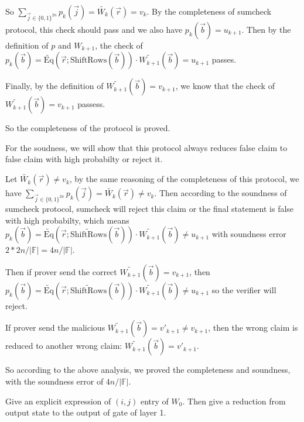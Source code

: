\documentclass[12pt]{article}
\newenvironment{ex}[2][Exercise]{\begin{trivlist}
\item[\hskip \labelsep {\bfseries #1}\hskip \labelsep {\bfseries #2.}]\begin{spacing}{1.0}}{\end{spacing}\end{trivlist}}
\newenvironment{sol}[1][Solution]{\begin{trivlist}
\item[\hskip \labelsep {\bfseries #1:}]}{\end{trivlist}}
\begin{document}
\begin{sol}
    So $\sum_{\vec{j}\in \{0,1\}^{2n}} p_k(\vec{j}) = \tilde{W_k}(\vec{r}) = v_k$. By the completeness of sumcheck protocol, this check should pass and we also have $p_k(\vec{b}) = u_{k+1}$. Then by the definition of $p$ and $W_{k+1}$, the check of $p_k(\vec{b}) = \tilde{\text{Eq}}(\vec{r};\text{ShiftRows}(\vec{b})) \cdot \tilde{W_{k+1}}(\vec{b}) = u_{k+1}$ passes.

    Finally, by the definition of $\tilde{W_{k+1}}(\vec{b}) = v_{k+1}$, we know that the check of $\tilde{W_{k+1}}(\vec{b}) = v_{k+1}$ passess.

    So the completeness of the protocol is proved.

    For the soudness, we will show that this protocol always reduces false claim to false claim with high probabilty or reject it.

    Let $\tilde{W_k}(\vec{r}) \ne v_k$, by the same reasoning of the completeness of this protocol, we have $\sum_{\vec{j}\in \{0,1\}^{2n}} p_k(\vec{j}) = \tilde{W_k}(\vec{r}) \ne v_k$. Then according to the soundness of sumcheck protocol, sumcheck will reject this claim or the final statement is false with high probabilty, which means $p_k(\vec{b}) = \tilde{\text{Eq}}(\vec{r};\tilde{\text{ShiftRows}}(\vec{b})) \cdot \tilde{W_{k+1}}(\vec{b}) \ne u_{k+1}$ with soundness error $2 * 2n / |\mathbb{F}| = 4n / |\mathbb{F}|$.

    Then if prover send the correct $\tilde{W_{k+1}}(\vec{b}) = v_{k+1}$, then $p_k(\vec{b}) = \tilde{\text{Eq}}(\vec{r};\tilde{\text{ShiftRows}}(\vec{b})) \cdot \tilde{W_{k+1}}(\vec{b}) \ne u_{k+1}$ so the verifier will reject.

    If prover send the malicious $\tilde{W_{k+1}}(\vec{b}) = v'_{k+1} \ne v_{k+1}$, then the wrong claim is reduced to another wrong claim: $\tilde{W_{k+1}}(\vec{b}) = v'_{k+1}$.

    So according to the above analysis, we proved the completeness and soundness, with the soundness error of $4n/|\mathbb{F}|$.
\end{sol}

\begin{ex}{1.e}
    Give an explicit expression of $(i,j)$ entry of $W_0$. Then give a reduction from output state to the output of gate of layer 1.
\end{ex}
\end{document}
